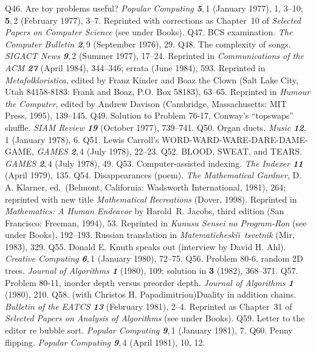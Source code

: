 \p Q46.  Are toy problems useful?  {\sl Popular Computing\/ \bf 5},\,1
 (January 1977), 1, 3--10; {\bf5},\,2 (February 1977), 3--7.  
 Reprinted with corrections as Chapter~10 of {\sl Selected Papers on
 Computer Science\/} (see under Books).
\p Q47.  BCS examination.  {\sl The Computer Bulletin\/ \bf 2},\,9
 (September 1976), 29.  
\p Q48.  The complexity of songs.  {\sl SIGACT News\/ \bf 9},\,2 
 (Summer 1977), 17--24. Reprinted in {\sl Communications of the ACM\/
 \bf 27} (April 1984), 344--346; errata (June 1984), 593.
 Reprinted in {\sl Metafolkloristica}, edited by Franz Kinder and
 Boaz the Clown (Salt Lake City, Utah 84158-8183: Frank and Boaz, P.O. Box
 58183), 63--65. Reprinted in {\sl Humour the Computer}, edited by
 Andrew Davison (Cambridge, Massachusetts: MIT Press, 1995), 139--145.
\p Q49.  Solution to Problem 76-17, Conway's ``topswaps'' shuffle.  {\sl SIAM
 Review\/ \bf 19} (October 1977), 739--741.  
\p Q50.  Organ duets.  {\sl Music\/ \bf 12},\,1 (January 1978), 6.
\p Q51.  Lewis Carroll's
 {\sc WORD}-{\sc WARD}-{\sc WARE}-{\sc DARE}-{\sc DAME}-{\sc GAME},
 {\sl GAMES\/ \bf 2},\,4 (July 1978), 22--23.  
\p Q52.  {\sc BLOOD}, {\sc SWEAT}, and {\sc TEARS}.  {\sl GAMES\/
 \bf 2},\,4 (July 1978), 49.
\p Q53.  Computer-assisted indexing.  {\sl The Indexer\/ \bf 11} (April 1979),
 135.
\p Q54.  Disappearances (poem).  {\sl The Mathematical Gardner},
 D. A. Klarner, ed.\ (Belmont, California: Wads\-worth International, 1981),
 264; reprinted with new title {\sl Mathematical Recreations\/} (Dover, 1998).
 Reprinted in {\sl Mathematics: A Human Endeavor} by Harold~R. Jacobs,
 third edition (San Francisco: Freeman, 1994), 53.
 Reprinted in {\sl Kunusu Sensei no Program-Ron\/} (see under Books),
 192--193.
 Russian translation in {\sl Matematicheski\u\i\ tsvetnik\/} (Mir, 1983), 329.
\p *Q55. Donald E. Knuth speaks out (interview by David H. Ahl). {\sl Creative
 Computing\/ \bf 6},\,1 (January 1980), 72--75.
\p Q56. Problem 80-6, random 2D trees.
 {\sl Journal of Algorithms\/ \bf 1} (1980), 109;
 solution in {\bf 3} (1982), 368--371.
\p Q57. Problem 80-11, inorder depth versus preorder depth.
 {\sl Journal of Algorithms\/ \bf 1} (1980), 210.
\p Q58. (with Christos H. Papadimitriou)\xskip Duality in addition chains.
 {\sl Bulletin of the EATCS\/ \bf 13} (February 1981), 2--4.
 Reprinted as Chapter~31 of {\sl Selected Papers on Analysis of Algorithms\/}
 (see under Books).
\p Q59. Letter to the editor re bubble sort.
 {\sl Popular Computing\/ \bf 9},\,1 (January 1981), 7.
\p Q60. Penny flipping. {\sl Popular Computing\/ \bf 9},\,4 (April 1981),
 10, 12.
